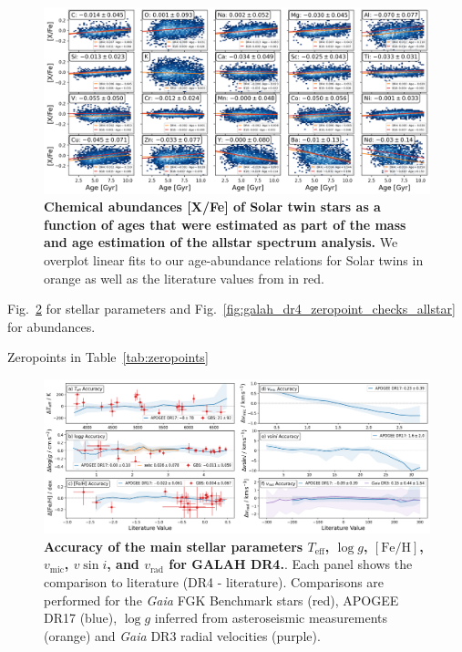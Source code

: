 \documentclass[
  journal=pasa,
  manuscript=research-paper, %
  year=2023,
  volume=37
]{cup-journal}
\newcommand{\SB}[1]{{\textcolor{purple}{#1}}}
\newcommand{\Teff}{$T_\mathrm{eff}$\xspace}
\newcommand{\logg}{$\log g$\xspace}
\newcommand{\feh}{$\mathrm{[Fe/H]}$\xspace}
\newcommand{\vmic}{$v_\mathrm{mic}$\xspace}
\newcommand{\vsini}{$v \sin i$\xspace}
\newcommand{\vrad}{$v_\mathrm{rad}$\xspace}
\newcommand{\Gaia}{\textit{Gaia}\xspace}
\begin{document}
\begin{figure}[ht]
 \centering
 \includegraphics[width=\textwidth]{figures/galah_dr4_age_xfe_trends_solar_twins_allstar.png}
 \caption{\textbf{Chemical abundances [X/Fe] of Solar twin stars as a function of ages that were estimated as part of the mass and age estimation of the allstar spectrum analysis.} We overplot linear fits to our age-abundance relations for Solar twins in orange as well as the literature values from \citet{Bedell2018} in red.}
 \label{fig:galah_dr4_age_xfe_trends_solar_twins_allstar}
\end{figure}



Fig.~\ref{fig:galah_dr4_validation_parameter_accuracy_allstar} for stellar parameters and Fig.~\ref{fig:galah_dr4_zeropoint_checks_allstar} for abundances.

Zeropoints in Table~\ref{tab:zeropoints}



\begin{figure}[ht]
 \centering
 \includegraphics[width=\textwidth]{figures/galah_dr4_validation_parameter_accuracy_allstar.png}
 \caption{\textbf{Accuracy of the main stellar parameters \Teff, \logg, \feh, \vmic, \vsini, and \vrad for GALAH DR4.}. Each panel shows the comparison to literature (DR4 - literature). Comparisons are performed for the \Gaia FGK Benchmark stars (red), APOGEE DR17 (blue), \logg inferred from asteroseismic measurements (orange) and \Gaia DR3 radial velocities (purple).}
 \label{fig:galah_dr4_validation_parameter_accuracy_allstar}
\end{figure}
\end{document}
